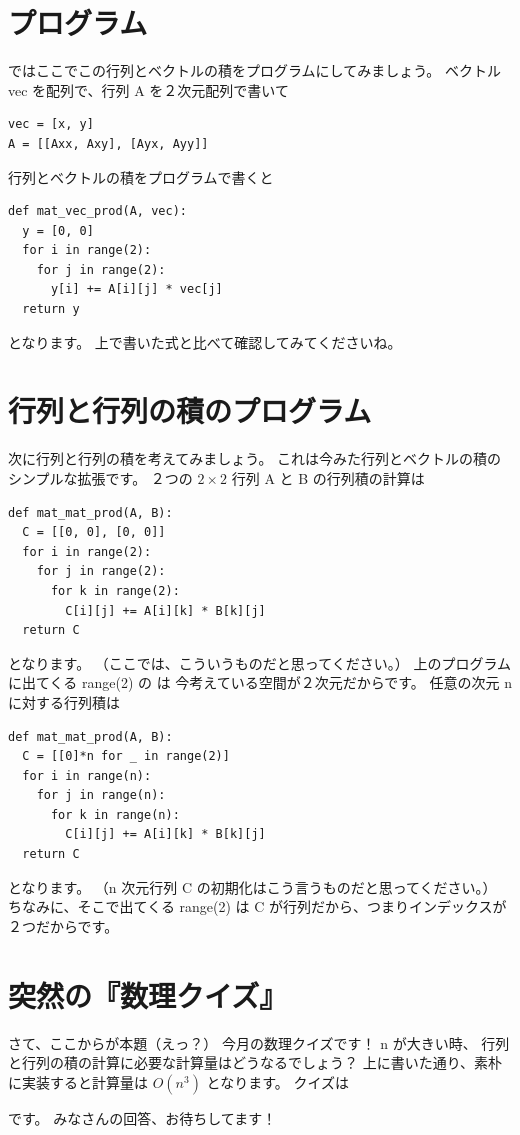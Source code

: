 \documentclass[dvipdfmx,autodetect-engine,10pt,b5paper,papersize,openany,dvipsnames]{jsbook}
\begin{document}
\begin{multicols}{2}
\vspace{4.4cm}

\section*{プログラム}
ではここでこの行列とベクトルの積をプログラムにしてみましょう。
ベクトル {\ttfamily vec} を配列で、行列 {\ttfamily A} を２次元配列で書いて
\begin{lstlisting}
vec = [x, y]
A = [[Axx, Axy], [Ayx, Ayy]]
\end{lstlisting}
行列とベクトルの積をプログラムで書くと
\begin{lstlisting}
def mat_vec_prod(A, vec):
  y = [0, 0]
  for i in range(2):
    for j in range(2):
      y[i] += A[i][j] * vec[j]
  return y
\end{lstlisting}
となります。
上で書いた式と比べて確認してみてくださいね。

\section*{行列と行列の積のプログラム}
次に行列と行列の積を考えてみましょう。
これは今みた行列とベクトルの積のシンプルな拡張です。
２つの $2\times 2$ 行列 {\ttfamily A} と {\ttfamily B} の行列積の計算は
\begin{lstlisting}
def mat_mat_prod(A, B):
  C = [[0, 0], [0, 0]]
  for i in range(2):
    for j in range(2):
      for k in range(2):
        C[i][j] += A[i][k] * B[k][j]
  return C
\end{lstlisting}
となります。
（ここでは、こういうものだと思ってください。）
上のプログラムに出てくる {\ttfamily range(2)} の {} は
今考えている空間が２次元だからです。
任意の次元 {\ttfamily n} に対する行列積は
\begin{lstlisting}
def mat_mat_prod(A, B):
  C = [[0]*n for _ in range(2)]
  for i in range(n):
    for j in range(n):
      for k in range(n):
        C[i][j] += A[i][k] * B[k][j]
  return C
\end{lstlisting}
となります。
（{\ttfamily n} 次元行列 {\ttfamily C} の初期化はこう言うものだと思ってください。）
ちなみに、そこで出てくる {\ttfamily range(2)} は
{\ttfamily C} が行列だから、つまりインデックスが２つだからです。


\section*{突然の『数理クイズ』}
さて、ここからが本題（えっ？）
今月の数理クイズです！
{\ttfamily n} が大きい時、
行列と行列の積の計算に必要な計算量はどうなるでしょう？
上に書いた通り、素朴に実装すると計算量は $O(n^3)$ となります。
クイズは
\begin{quote}
\end{quote}
です。
みなさんの回答、お待ちしてます！

\end{multicols}
\end{document}
